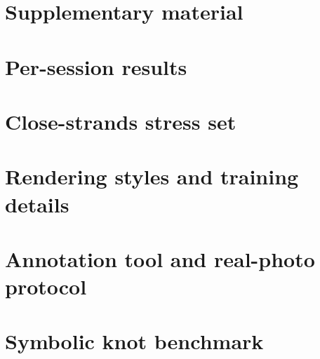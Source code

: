 \section*{Supplementary material}
\setcounter{section}{0}
\section{Per-session results}
\begin{table}[h]\centering\small
\caption{\bench{} by session, full model.}\label{tab:sessions}\end{table}
\section{Close-strands stress set}
\begin{table}[h]\centering\small
\caption{Answered fraction by gap; wrong answers in brackets.}\label{tab:close}\end{table}
\section{Rendering styles and training details}
\section{Annotation tool and real-photo protocol}
\section{Symbolic knot benchmark}
